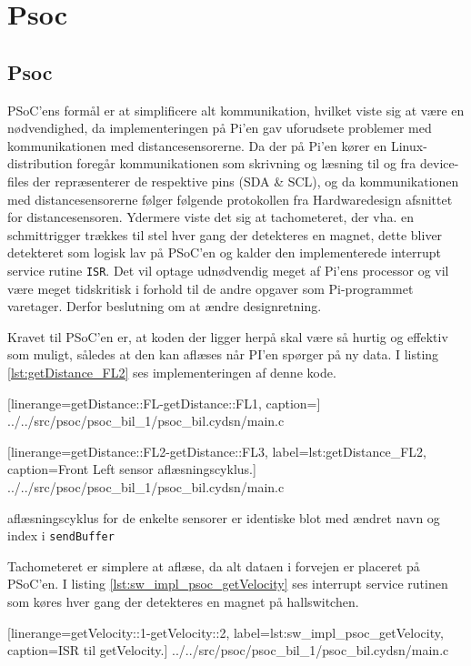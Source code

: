 \section{Psoc} \label{sub:sw_impl_psoc_psoc}
\subsection{Psoc}
PSoC'ens formål er at simplificere alt \IIC kommunikation, hvilket viste sig at være en nødvendighed, da implementeringen på Pi'en gav uforudsete problemer med kommunikationen med distancesensorerne.
Da der på Pi'en kører en Linux-distribution foregår \IIC kommunikationen som skrivning og læsning til og fra device-files der repræsenterer de respektive pins (SDA \& SCL), og da kommunikationen med distancesensorerne følger følgende protokollen fra Hardwaredesign afsnittet for distancesensoren.
Ydermere viste det sig at tachometeret, der vha. en schmittrigger trækkes til stel hver gang der detekteres en magnet, dette bliver detekteret som logisk lav på PSoC'en og  kalder den implementerede interrupt service rutine \texttt{ISR}. 
Det vil optage udnødvendig meget af Pi'ens processor og vil være meget tidskritisk i forhold til de andre opgaver som Pi-programmet varetager. Derfor beslutning om at ændre designretning.

Kravet til PSoC'en er, at koden der ligger herpå skal være så hurtig og effektiv som muligt, således at den kan aflæses når PI'en spørger på ny data. 
I listing \ref{lst:getDistance_FL2} ses implementeringen af denne kode.


	[linerange=getDistance::FL-getDistance::FL1, caption=]
	{../../src/psoc/psoc_bil_1/psoc_bil.cydsn/main.c}


	[linerange=getDistance::FL2-getDistance::FL3, label=lst:getDistance_FL2, caption=Front Left sensor aflæsningscyklus.]
	{../../src/psoc/psoc_bil_1/psoc_bil.cydsn/main.c}
	
aflæsningscyklus for de enkelte sensorer er identiske blot med ændret navn og index i \texttt{sendBuffer}

Tachometeret er simplere at aflæse, da alt dataen i forvejen er placeret på PSoC'en. I listing \ref{lst:sw_impl_psoc_getVelocity} ses interrupt service rutinen som køres hver gang der detekteres en magnet på hallswitchen.


	[linerange=getVelocity::1-getVelocity::2, label=lst:sw_impl_psoc_getVelocity, caption=ISR til getVelocity.]
	{../../src/psoc/psoc_bil_1/psoc_bil.cydsn/main.c}

